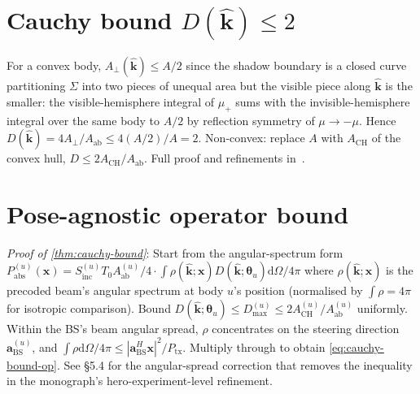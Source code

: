 \documentclass[journal,twocolumn,10pt]{IEEEtran}
\theoremstyle{definition}
\newcommand{\khat}{\hat{\bm{k}}}
\newcommand{\xx}{\mathbf{x}}
\newcommand{\avec}{\mathbf{a}}
\newcommand{\Sinc}{S_{\mathrm{inc}}}
\newcommand{\Pabs}{P_{\mathrm{abs}}}
\newcommand{\Ptx}{P_{\mathrm{tx}}}
\newcommand{\diff}{\mathrm{d}}
\newcommand{\Aperp}{A_{\perp}}
\newcommand{\Aab}{A_{\mathrm{ab}}}
\begin{document}
\section{Cauchy bound $D(\khat)\le 2$}\label{app:cauchy}

For a convex body, $\Aperp(\khat)\le A/2$ since the shadow
boundary is a closed curve partitioning $\Sigma$ into two pieces
of unequal area but the visible piece along $\khat$ is the
smaller: the visible-hemisphere integral of $\mu_+$ sums with the
invisible-hemisphere integral over the same body to $A/2$ by
reflection symmetry of $\mu\to-\mu$. Hence
$D(\khat)=4\Aperp/\Aab\le 4(A/2)/A=2$. Non-convex: replace $A$
with $A_{\mathrm{CH}}$ of the convex hull, $D\le 2A_{\mathrm{CH}}/\Aab$.
Full proof and refinements in~\cite[\S5.3]{WydaegheMonograph}.

\section{Pose-agnostic operator bound}\label{app:cauchy-bound}

\emph{Proof of \cref{thm:cauchy-bound}}: Start from the
angular-spectrum form
$\Pabs^{(u)}(\xx)=\Sinc^{(u)}T_0\Aab^{(u)}/4\cdot
\int\rho(\khat;\xx)D(\khat;\bm\theta_u)\diff\Omega/4\pi$
where $\rho(\khat;\xx)$ is the precoded beam's angular spectrum
at body $u$'s position (normalised by $\int\rho=4\pi$ for
isotropic comparison). Bound
$D(\khat;\bm\theta_u)\le D_{\max}^{(u)}\le 2A_{\mathrm{CH}}^{(u)}/\Aab^{(u)}$
uniformly. Within the BS's beam angular spread, $\rho$
concentrates on the steering direction
$\avec^{(u)}_{\mathrm{BS}}$, and
$\int\rho\diff\Omega/4\pi\le|\avec_{\mathrm{BS}}^H\xx|^2/\Ptx$.
Multiply through to obtain \cref{eq:cauchy-bound-op}. See
\cite{WydaegheMonograph} \S5.4 for the angular-spread correction
that removes the inequality in the monograph's
hero-experiment-level refinement.
\end{document}
